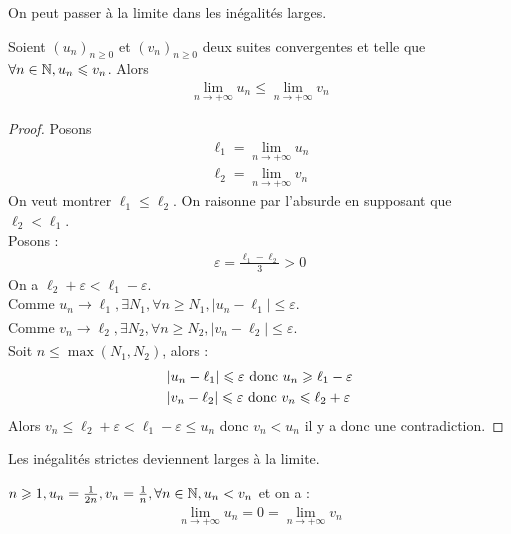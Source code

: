 \par On peut passer à la limite dans les inégalités larges.

\begin{graybox}
    \begin{theoreme}[]
    Soient $(u_n)_{n \geq 0}$ et $(v_n)_{n \geq 0}$ deux suites convergentes et telle que $\forall n \in \N, u_n \leq v_n$. Alors
    \begin{align*}
        \lim_{n \to +\infty} u_n \leq \lim_{n \to +\infty} v_n
    \end{align*}
\end{theoreme}
\end{graybox}

\begin{proof}
    Posons 
    \begin{align*}
        \ell_1 = \lim_{n \to +\infty} u_n \\
        \ell_2 = \lim_{n \to +\infty} v_n
    \end{align*}
    On veut montrer $\ell_1 \leq \ell_2$. 
    On raisonne par l'absurde en supposant que $\ell_2 < \ell_1$.
    \\
    Posons :
    \begin{align*}
        \varepsilon = \frac{\ell_1 - \ell_2}{3} > 0
    \end{align*}
    On a $\ell_2 + \varepsilon < \ell_1 - \varepsilon$.
    \\
    Comme $u_n \xrightarrow[]{} \ell_1, \exists N_1, \forall n \geq N_1, |u_n - \ell_1| \leq \varepsilon$.
    \\
    Comme $v_n \xrightarrow[]{} \ell_2, \exists N_2, \forall n \geq N_2, |v_n - \ell_2| \leq \varepsilon$.
    \\
    Soit $n \leq \max(N_1, N_2)$, alors :
    \begin{align*}
        &|u_n - \ell_1| \leq \varepsilon \textnormal{ donc } u_n \geq \ell_1 - \varepsilon \\
        &|v_n - \ell_2| \leq \varepsilon \textnormal{ donc } v_n \leq \ell_2 + \varepsilon
    \end{align*}
    Alors $v_n \leq \ell_2 + \varepsilon < \ell_1 - \varepsilon \leq u_n$ donc $v_n < u_n$ il y a donc une contradiction.
\end{proof}

\begin{remarque}
    Les inégalités strictes deviennent larges à la limite.
\end{remarque}

\begin{exemple}
    $n \geq 1, u_n = \frac{1}{2n}, v_n = \frac{1}{n}, \forall n \in \N, u_n < v_n$ et on a : 
    \begin{align*}
        \lim_{n \to +\infty} u_n = 0 = \lim_{n \to +\infty} v_n
    \end{align*}
\end{exemple}

